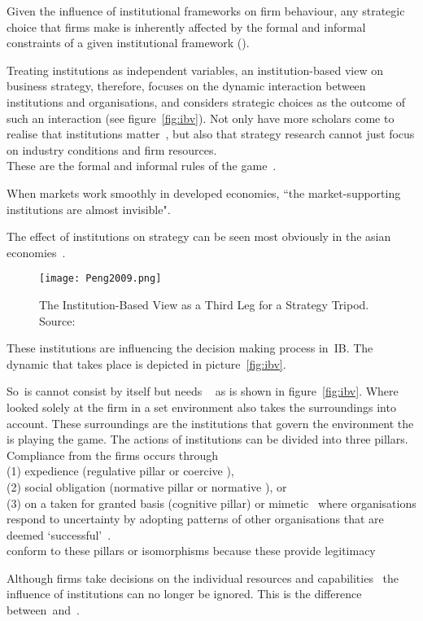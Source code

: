 Given the influence of institutional frameworks on firm behaviour, any strategic choice that firms make is inherently affected by the formal and informal constraints of a given institutional framework (\cite{North:1990,Oliver:1997}). 




Treating institutions as independent variables, an institution-based view on business strategy, therefore, focuses on the dynamic interaction between institutions and organisations, and considers strategic choices as the outcome of such an interaction (see figure~\ref{fig:ibv})\cite{Peng:2002}.
Not only have more scholars come to realise that institutions matter~\cite{Powell:1991,Scott:1995}, but also that strategy research cannot just focus on industry conditions and firm resources.~\cite{Khanna:1997}\\

These are the formal and informal rules of the game~\cite{North:1990}. 








When markets work smoothly in developed economies, ``the market-supporting institutions are almost invisible".~\cite{McMillan:2007}

The effect of institutions on strategy can be seen most obviously in the asian economies~\cite{Peng:2002}.




\begin{figure}[htbp!] 
      \label{fig:Peng2009}
	\centering
	\texttt{[image: Peng2009.png]}
 	\caption{The Institution-Based View as a Third Leg for a Strategy Tripod. Source:~\cite{Peng:2009}}
\end{figure}









These institutions are influencing the decision making process in~\gls{IB}.  The dynamic that takes place is depicted in picture~\ref{fig:ibv}. 


So~\ibv is cannot consist by itself but needs \rbv~\cite{Barney:1991, Porter:1980} as is shown in figure~\ref{fig:ibv}. 
Where \rbv looked solely at the firm in a set environment \ibv also takes the surroundings into account. These surroundings are the institutions that govern the environment the \mne is playing the game. 
The actions of institutions can be divided into three pillars. Compliance from the firms occurs through \\(1) expedience (regulative pillar or coercive \iso),\\
 (2) social obligation (normative pillar or normative \iso), or \\
 (3) on a taken for granted basis (cognitive pillar) or mimetic \iso~where organisations respond to uncertainty by adopting patterns of other organisations that are deemed `successful'~\cite{Westney:2005,Peng:2008,Kostova:1999,DiMaggio:1983,Scott:1995}.\\ 
\mne conform to these pillars or isomorphisms because these provide legitimacy~\cite{Powell:1991}

Although firms take decisions on the individual resources and capabilities~\cite{Barney:1991} the influence of institutions can no longer be ignored. This is the difference between~\rbv and~\ibv. 


